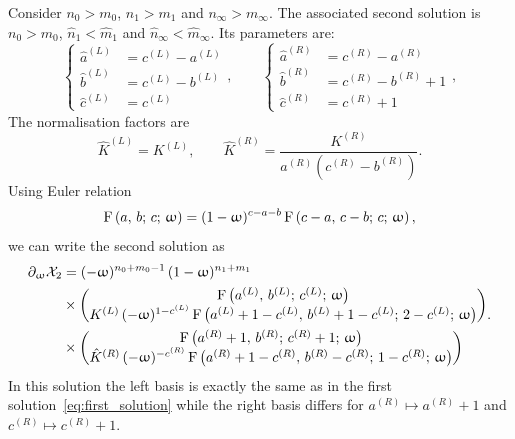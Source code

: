 Consider $n_{0} > m_{0}$, $n_{1} > m_{1}$ and $n_{\infty} > m_{\infty}$.
The associated second solution is $n_{0} > m_{0}$, $\hat{n}_{1} < \hat{m}_{1}$ and $\hat{n}_{\infty} < \hat{m}_{\infty}$.
Its parameters are:
\begin{equation}
  \begin{cases}
    \hat{a}^{(L)} & = c^{(L)} - a^{(L)}
    \\
    \hat{b}^{(L)} & = c^{(L)} - b^{(L)}
    \\
    \hat{c}^{(L)} & = c^{(L)}
  \end{cases},
  \qquad
  \begin{cases}
    \hat{a}^{(R)} & = c^{(R)} - a^{(R)}
    \\
    \hat{b}^{(R)} & = c^{(R)} - b^{(R)} + 1
    \\
    \hat{c}^{(R)} & = c^{(R)} + 1
  \end{cases},
\end{equation}
The normalisation factors are
\begin{equation}
  \hat{K}^{(L)} = K^{(L)},
  \qquad
  \hat{K}^{(R)} = \frac{K^{(R)}}{a^{(R)} (c^{(R)} - b^{(R)})}.
\end{equation}
Using Euler relation
\begin{equation}
  \mathrm{F}\left( a,\, b;\, c;\, \upomega \right) = (1-\upomega)^{c-a-b}\, \mathrm{F}\left( c-a,\, c-b;\, c;\, \upomega \right),
\end{equation}
we can write the second solution as
\begin{equation}
  \begin{split}
    \ipd{\omega} \cX_2
    & =
    (-\omega)^{n_{0} + m_{0} - 1}\,
    (1-\omega)^{n_{1} + m_{1}}\,
    \\
    & \times
    \mqty(
      \hyp{a^{(L)}}{b^{(L)}}{c^{(L)}}{\omega}
      \\
      K^{(L)}\, (-\omega)^{1 - c^{(L)}}\,
      \hyp{a^{(L)} + 1 - c^{(L)}}{b^{(L)} + 1 - c^{(L)}}{2 - c^{(L)}}{\omega}
    )
    \\
    & \times
    \mqty(
      \hyp{a^{(R)} + 1}{b^{(R)}}{c^{(R)} + 1}{\omega}
      \\
      \hat{K}^{(R)}\, (-\omega)^{- c^{(R)}}\,
      \hyp{a^{(R)} + 1 - c^{(R)}}{b^{(R)} - c^{(R)}}{1 - c^{(R)}}{\omega}
    )
  \end{split}.
\end{equation}
In this solution the left basis is exactly the same as in the first solution~\eqref{eq:first_solution} while the right basis differs for $a^{(R)} \mapsto a^{(R)} + 1$ and $c^{(R)} \mapsto c^{(R)} + 1$.


